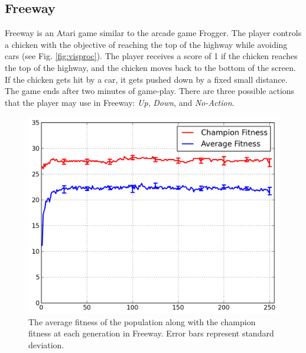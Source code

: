 \documentclass{acm_proc_article-sp}
\begin{document}
\subsection {Freeway}
Freeway is an Atari game similar to the arcade game Frogger. The player controls a chicken with the objective of reaching the top of the highway while avoiding cars (see Fig. \ref{fig:visproc}). The player receives a score of 1 if the chicken reaches the top of the highway, and the chicken moves back to the bottom of the screen. If the chicken gets hit by a car, it gets pushed down by a fixed small distance. The game ends after two minutes of game-play. There are three possible actions that the player may use in Freeway: \textit{Up}, \textit{Down}, and \textit{No-Action}.

\begin{figure}[ht]
\begin{center}
\includegraphics[width=\columnwidth]{figures/freeway-results.png}
\end{center}
\caption{The average fitness of the population along with the champion fitness at each generation in Freeway. Error bars represent standard deviation.}
\label{fig:freeway-curve}
\end{figure}
\end{document}
